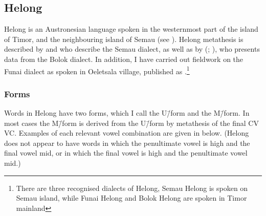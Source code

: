 \subsection{Helong}\label{sec:Hel}
Helong is an Austronesian language spoken in the westernmost part of the island of Timor,
and the neighbouring island of Semau (see ).
Helong metathesis is described by \citet{baca12} and \citet{ba15,ba17b}
who describe the Semau dialect,
as well as by \citeauthor{st96b} (\citeyear{st96b}; \citeyear{st08}),
who presents data from the Bolok dialect.
In addition, I have carried out fieldwork on the Funai dialect
as spoken in Oeletsala village, published as \cite{ed18c}.\footnote{
		There are three recognised dialects of Helong,
		Semau Helong is spoken on Semau island, while Funai
		Helong and Bolok Helong are spoken in Timor mainland}

\subsubsection{Forms}\label{sec:HelFor}
Words in Helong have two forms,
which I call the U\=/form and the M\=/form.
In most cases the M\=/form is derived from the U\=/form
by metathesis of the final CV {\ra} VC.
Examples of each relevant vowel combination are given in  below.
(Helong does not appear to have words in which the penultimate vowel
is high and the final vowel mid,
or in which the final vowel is high and the penultimate vowel mid.)

\begin{exe}
	\label{ex:VCV->VVC-Hel}
\end{exe}

